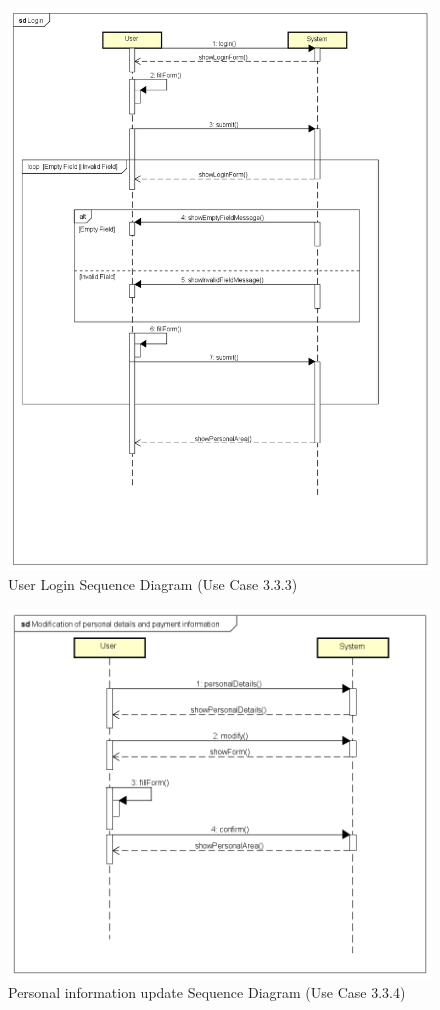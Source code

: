 \begin{figure}[H]	
	\centering
	\includegraphics[width = \textwidth]{img/sequence2}
	\caption{User Login Sequence Diagram (Use Case 3.3.3)}
\end{figure}

\begin{figure}[H]	
	\centering
	\includegraphics[width = \textwidth]{img/sequence3}
	\caption{Personal information update Sequence Diagram (Use Case 3.3.4)}
\end{figure}

